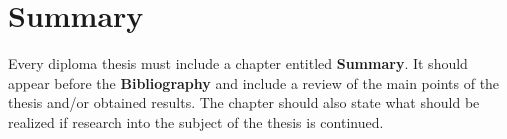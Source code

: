 \chapter{Summary}

Every diploma thesis must include a chapter entitled \textbf{Summary}. It should appear before the \textbf{Bibliography} and include a review of the main points of the thesis and/or obtained results. The chapter should also state what should be realized if research into the subject of the thesis is continued.